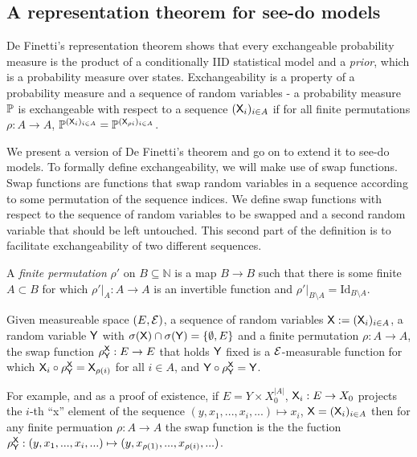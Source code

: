 \subsection{A representation theorem for see-do models}

De Finetti's representation theorem shows that every exchangeable probability measure is the product of a conditionally IID statistical model and a \emph{prior}, which is a probability measure over states. Exchangeability is a property of a probability measure and a sequence of random variables - a probability measure $\mathbb{P}$ is exchangeable with respect to a sequence $(\mathsf{X}_i)_{i\in A}$ if for all finite permutations $\rho:A\to A$, $\mathbb{P}^{(\mathsf{X}_i)_{i\in A}} = \mathbb{P}^{(\mathsf{X}_{\rho{i}})_{i\in A}}$.

We present a version of De Finetti's theorem and go on to extend it to see-do models. To formally define exchangeability, we will make use of swap functions. Swap functions are functions that swap random variables in a sequence according to some permutation of the sequence indices. We define swap functions with respect to the sequence of random variables to be swapped and a second random variable that should be left untouched. This second part of the definition is to facilitate exchangeability of two different sequences.

\begin{definition}[Permutations]\label{def:permutation}
A \emph{finite permutation} $\rho'$ on $B\subseteq\mathbb{N}$ is a map $B\to B$ such that there is some finite $A\subset B$ for which $\rho'|_A:A\to A$ is an invertible function and $\rho'|_{B\setminus A} = \mathrm{Id}_{B\setminus A}$.
\end{definition}

\begin{definition}\label{def:swap}
Given measureable space $(E,\mathcal{E})$, a sequence of random variables $\mathsf{X}:=(\mathsf{X}_i)_{i\in A}$, a random variable $\mathsf{Y}$ with $\sigma(\mathsf{X})\cap \sigma(\mathsf{Y})=\{\emptyset,E\}$ and a finite permutation $\rho:A\to A$, the swap function $\rho^{\mathsf{X}}_{\mathsf{Y}}:E\to E$ that holds $\mathsf{Y}$ fixed is a $\mathcal{E}$-measurable function for which $\mathsf{X}_i\circ \rho^{\mathsf{X}}_{\mathsf{Y}}=\mathsf{X}_{\rho(i)} $ for all $i\in A$, and $\mathsf{Y}\circ\rho^{\mathsf{X}}_{\mathsf{Y}}=\mathsf{Y}$.
\end{definition}

For example, and as a proof of existence, if $E = Y\times X_0^{|A|}$, $\mathsf{X}_i:E\to X_0$ projects the $i$-th ``x'' element of the sequence $(y,x_1,...,x_i,...)\mapsto x_i$, $\mathsf{X}=(\mathsf{X}_i)_{i\in A}$ then for any finite permuation $\rho:A\to A$ the swap function is the the fuction $\rho^{\mathsf{X}}_{\mathsf{Y}}:(y,x_1,...,x_i,...)\mapsto (y,x_{\rho(1)},...,x_{\rho(i)},...)$.


